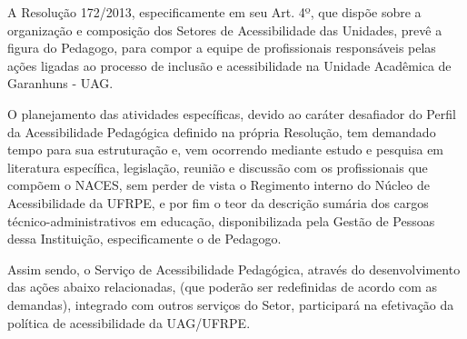 \documentclass[
	12pt,				%
	openright,			%
  oneside,     %
	a4paper,			%
	chapter=TITLE,		%
	english,			%
	french,				%
	spanish,			%
	brazil				%
	]{abntex2}
\begin{document}
A Resolução 172/2013, especificamente em seu Art. 4º, que dispõe sobre a organização e composição dos Setores de Acessibilidade das Unidades, prevê a figura do Pedagogo, para compor a equipe de profissionais responsáveis pelas ações ligadas ao processo de inclusão e acessibilidade na Unidade Acadêmica de Garanhuns - UAG.

O planejamento das atividades específicas, devido ao caráter desafiador do Perfil da Acessibilidade Pedagógica definido na própria Resolução, tem demandado tempo para sua estruturação e, vem ocorrendo mediante estudo e pesquisa em literatura específica, legislação, reunião e discussão com os profissionais que compõem o NACES, sem perder de vista o Regimento interno do Núcleo de Acessibilidade da UFRPE, e por fim o teor da descrição sumária dos cargos técnico-administrativos em educação, disponibilizada pela Gestão de Pessoas dessa Instituição, especificamente o de Pedagogo.

Assim sendo, o Serviço de Acessibilidade Pedagógica, através do desenvolvimento das ações abaixo relacionadas, (que poderão ser redefinidas de acordo com as demandas), integrado com outros serviços do Setor, participará na efetivação da política de acessibilidade da UAG/UFRPE.
\end{document}
